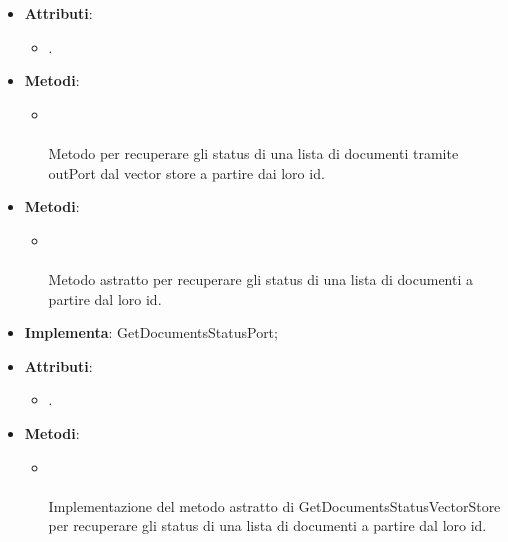 \documentclass[10pt, a4paper]{article}
\begin{document}
\label{GetDocumentsStatusDettaglio}
\begin{itemize}
    \item \textbf{Attributi}:
    \begin{itemize}
        \item {}.
    \end{itemize}
    \item \textbf{Metodi}:
    \begin{itemize}
        \item {}\\ \\
        Metodo per recuperare gli status di una lista di documenti tramite outPort dal vector store a partire dai loro id.
    \end{itemize}
\end{itemize}

\label{GetDocumentsStatusPortDettaglio}
\begin{itemize}
    \item \textbf{Metodi}:
    \begin{itemize}
        \item {}\\ \\
        Metodo astratto per recuperare gli status di una lista di documenti a partire dal loro id.
    \end{itemize}
\end{itemize}


\label{GetDocumentsStatusVectorStoreDettaglio}
\begin{itemize}
    \item \textbf{Implementa}: GetDocumentsStatusPort;
    \item \textbf{Attributi}:
    \begin{itemize}
        \item {}.
    \end{itemize}
    \item \textbf{Metodi}:
    \begin{itemize}
        \item {}\\ \\
        Implementazione del metodo astratto di GetDocumentsStatusVectorStore per recuperare gli status di una lista di documenti a partire dal loro id.
    \end{itemize}
\end{itemize}
\end{document}
